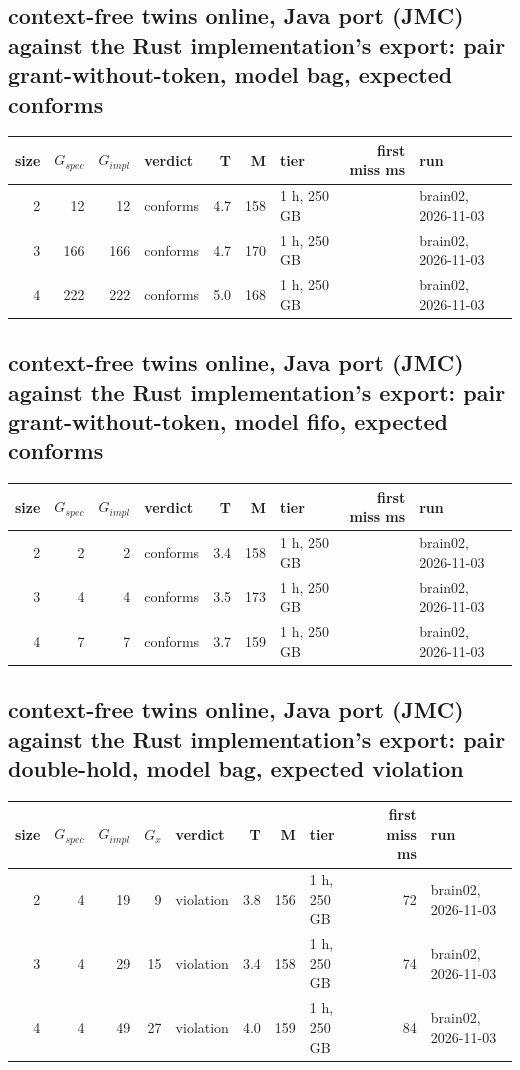 \documentclass[10pt]{article}
\begin{document}
\subsection*{context-free twins online, Java port (JMC) against the Rust implementation's export: pair \textsf{grant-without-token}, model bag, expected conforms}
\begin{longtable}{@{}rrrlrrlrl@{}}
\toprule
size & $G_{\mathit{spec}}$ & $G_{\mathit{impl}}$ & verdict & T & M & tier & first miss ms & run \\
\midrule
\endhead
\color{red} 2 & 12 & 12 & conforms & 4.7 & 158 & 1 h, 250 GB &  & brain02, 2026-11-03 \\
\color{red} 3 & 166 & 166 & conforms & 4.7 & 170 & 1 h, 250 GB &  & brain02, 2026-11-03 \\
\color{red} 4 & 222 & 222 & conforms & 5.0 & 168 & 1 h, 250 GB &  & brain02, 2026-11-03 \\
\bottomrule
\end{longtable}
\subsection*{context-free twins online, Java port (JMC) against the Rust implementation's export: pair \textsf{grant-without-token}, model fifo, expected conforms}
\begin{longtable}{@{}rrrlrrlrl@{}}
\toprule
size & $G_{\mathit{spec}}$ & $G_{\mathit{impl}}$ & verdict & T & M & tier & first miss ms & run \\
\midrule
\endhead
\color{red} 2 & 2 & 2 & conforms & 3.4 & 158 & 1 h, 250 GB &  & brain02, 2026-11-03 \\
\color{red} 3 & 4 & 4 & conforms & 3.5 & 173 & 1 h, 250 GB &  & brain02, 2026-11-03 \\
\color{red} 4 & 7 & 7 & conforms & 3.7 & 159 & 1 h, 250 GB &  & brain02, 2026-11-03 \\
\bottomrule
\end{longtable}
\subsection*{context-free twins online, Java port (JMC) against the Rust implementation's export: pair \textsf{double-hold}, model bag, expected violation}
\begin{longtable}{@{}rrrrlrrlrl@{}}
\toprule
size & $G_{\mathit{spec}}$ & $G_{\mathit{impl}}$ & $G_x$ & verdict & T & M & tier & first miss ms & run \\
\midrule
\endhead
\color{red} 2 & 4 & 19 & 9 & violation & 3.8 & 156 & 1 h, 250 GB & 72 & brain02, 2026-11-03 \\
\color{red} 3 & 4 & 29 & 15 & violation & 3.4 & 158 & 1 h, 250 GB & 74 & brain02, 2026-11-03 \\
\color{red} 4 & 4 & 49 & 27 & violation & 4.0 & 159 & 1 h, 250 GB & 84 & brain02, 2026-11-03 \\
\bottomrule
\end{longtable}
\end{document}
